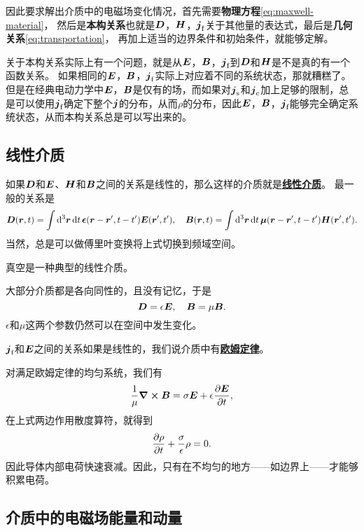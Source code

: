 \documentclass[UTF8, a4paper]{ctexart}
\renewcommand{\emph}[1]{\textbf{#1}}
\newcommand*{\concept}[1]{\underline{\textbf{#1}}}
\begin{document}
因此要求解出介质中的电磁场变化情况，首先需要\emph{物理方程}\eqref{eq:maxwell-material}，
然后是\emph{本构关系}也就是$\vb*{D}$，$\vb*{H}$，$\vb*{j}_\text{f}$关于其他量的表达式，最后是\emph{几何关系}\eqref{eq:transportation}，
再加上适当的边界条件和初始条件，就能够定解。

关于本构关系实际上有一个问题，就是从$\vb*{E}$，$\vb*{B}$，$\vb*{j}_\text{f}$到$\vb*{D}$和$\vb*{H}$是不是真的有一个函数关系。
如果相同的$\vb*{E}$，$\vb*{B}$，$\vb*{j}_\text{f}$实际上对应着不同的系统状态，那就糟糕了。
但是在经典电动力学中$\vb*{E}$，$\vb*{B}$是仅有的场，而如果对$\vb*{j}_\text{s}$和$\vb*{j}_\text{c}$加上足够的限制，总是可以使用$\vb*{j}_\text{f}$确定下整个$\vb*{j}$的分布，从而$\rho$的分布，因此$\vb*{E}$，$\vb*{B}$，$\vb*{j}_\text{f}$能够完全确定系统状态，从而本构关系总是可以写出来的。

\subsection{线性介质}

如果$\vb*{D}$和$\vb*{E}$、$\vb*{H}$和$\vb*{B}$之间的关系是线性的，那么这样的介质就是\concept{线性介质}。
最一般的关系是
\begin{equation}
    \vb*{D}(\vb*{r}, t) = \int \dd[3]{\vb*{r}} \dd{t} \vb*{\epsilon}(\vb*{r} - \vb*{r}', t - t') \vb*{E}(\vb*{r}', t'), \quad
    \vb*{B}(\vb*{r}, t) = \int \dd[3]{\vb*{r}} \dd{t} \vb*{\mu}(\vb*{r} - \vb*{r}', t - t') \vb*{H}(\vb*{r}', t').
\end{equation}
当然，总是可以做傅里叶变换将上式切换到频域空间。

真空是一种典型的线性介质。

大部分介质都是各向同性的，且没有记忆，于是
\begin{equation}
    \vb*{D} = \epsilon \vb*{E}, \quad \vb*{B} = \mu \vb*{B}.
\end{equation}
$\epsilon$和$\mu$这两个参数仍然可以在空间中发生变化。

$\vb*{j}_\text{f}$和$\vb*{E}$之间的关系如果是线性的，我们说介质中有\concept{欧姆定律}。

对满足欧姆定律的均匀系统，我们有
\[
    \frac{1}{\mu} \curl{\vb*{B}} = \sigma \vb*{E} + \epsilon \pdv{\vb*{E}}{t},
\]
在上式两边作用散度算符，就得到
\begin{equation}
    \pdv{\rho}{t} + \frac{\sigma}{\epsilon} \rho = 0.
\end{equation}
因此导体内部电荷快速衰减。因此，只有在不均匀的地方——如边界上——才能够积累电荷。

\subsection{介质中的电磁场能量和动量}
\end{document}
